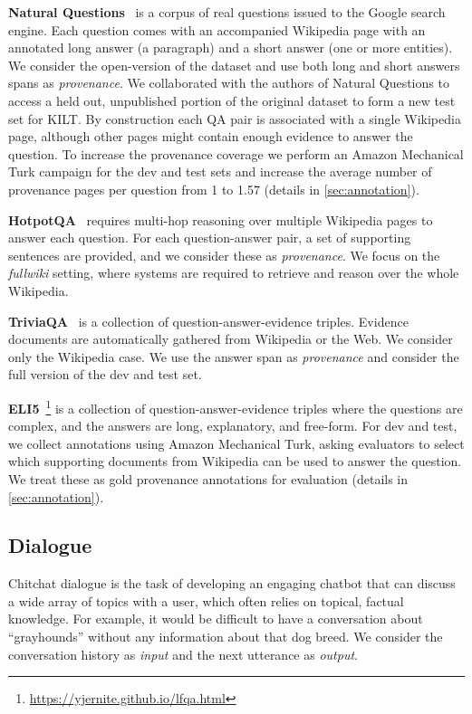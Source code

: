\documentclass[11pt]{article}
\begin{document}
\textbf{Natural Questions}~\cite{kwiatkowski2019natural} is a corpus of real questions issued to the Google search engine. Each question comes with an accompanied Wikipedia page with an annotated long answer (a paragraph) and a short answer (one or more entities).
We consider the open-version of the dataset and use both long and short answers spans as \textit{provenance}.
We collaborated with the authors of Natural Questions to access a held out, unpublished portion of the original dataset to form a new test set for KILT.
By construction each QA pair is associated with a single Wikipedia page, although other pages might contain enough evidence to answer the question. To increase the provenance coverage we perform an Amazon Mechanical Turk campaign for the dev and test sets and increase the average number of provenance pages per question from 1 to 1.57 (details in \cref{sec:annotation}).

\textbf{HotpotQA}~\cite{yang2018hotpotqa} requires multi-hop reasoning over multiple Wikipedia pages to answer each question. For each question-answer pair, a set of supporting sentences are provided, and we consider these as \textit{provenance}. We focus on the \textit{fullwiki} setting, where systems are required to retrieve and reason over the whole Wikipedia. 

\textbf{TriviaQA}~\cite{joshi2017triviaqa} is a collection of question-answer-evidence triples. Evidence documents are automatically gathered from Wikipedia or the Web. We consider only the Wikipedia case. 
We use the answer span as \textit{provenance} and consider the full version of the dev and test set. 

\textbf{ELI5}~\cite{fan2019eli5}\footnote{\url{https://yjernite.github.io/lfqa.html}} is a collection of question-answer-evidence triples where the questions are complex, and the answers are long, explanatory, and free-form.  
For dev and test, we collect annotations using Amazon Mechanical Turk, asking evaluators to select which supporting documents from Wikipedia can be used to answer the question. We treat these as gold provenance annotations for evaluation (details in \cref{sec:annotation}).


\subsection{Dialogue}

Chitchat dialogue is the task of developing an engaging chatbot that can discuss a wide array of topics with a user, which often relies on topical, factual knowledge. For example, it would be difficult to have a conversation about ``grayhounds'' without any information about that dog breed. We consider the conversation history as \emph{input} and the next utterance as  \emph{output}.
\end{document}
